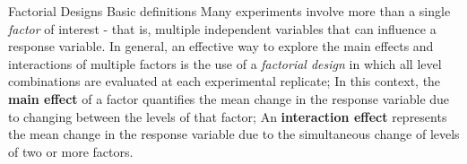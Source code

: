 \documentclass[t]{beamer}
\begin{document}

\begin{ftst}
{Factorial Designs}
{Basic definitions}
Many experiments involve more than a single \textit{factor} of interest - that is, multiple independent variables that can influence a response variable.
\vone
In general, an effective way to explore the main effects and interactions of multiple factors is the use of a \textit{factorial design} in which all level combinations are evaluated at each experimental replicate;
\vone
In this context, the \textbf{main effect} of a factor quantifies the mean change in the response variable due to changing between the levels of that factor;
\vone
An \textbf{interaction effect} represents the mean change in the response variable due to the simultaneous change of levels of two or more factors.
\end{ftst}

\end{document}
